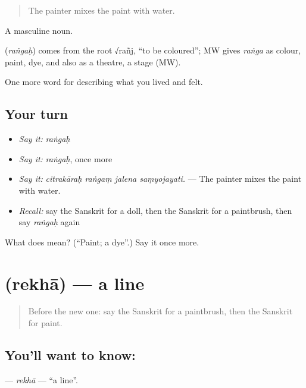 \begin{quote}
The painter mixes the paint with water.
\end{quote}

A masculine noun.

\begin{cousinweb}
\textbf{} (\emph{raṅgaḥ}) comes from the root √rañj, \textquotedblleft{}to be coloured\textquotedblright{}; MW gives \emph{raṅga} as colour, paint, dye, and also as a theatre, a stage (MW).
\end{cousinweb}

\begin{grammarlens}[title={What you've built}]
One more word for describing what you lived and felt.
\end{grammarlens}

\subsection*{Your turn}
\begin{itemize}
\raggedright
  \item \emph{Say it:} \emph{raṅgaḥ}
  \item \emph{Say it:} \emph{raṅgaḥ}, once more
  \item \emph{Say it:} \emph{citrakāraḥ raṅgaṃ jalena saṃyojayati.} — The painter mixes the paint with water.
  \item \emph{Recall:} say the Sanskrit for a doll, then the Sanskrit for a paintbrush, then say \emph{raṅgaḥ} again
\end{itemize}

\begin{tcolorbox}[breakable,colback=teal!4,colframe=teal!35!black,title={Before you move on}]
What does  mean? (\textquotedblleft{}Paint; a dye\textquotedblright{}.) Say it once more.
\end{tcolorbox}
\section[\texorpdfstring{\sk{रेखा} (rekhā)}{रेखा (rekhā)}]{ (rekhā) — a line}

\label{lesson:SA-C518-rekha}



\begin{quote}
Before the new one: say the Sanskrit for a paintbrush, then the Sanskrit for paint.
\end{quote}

\subsection*{You'll want to know: }
\textbf{} — \emph{rekhā} — \textquotedblleft{}a line\textquotedblright{}.

